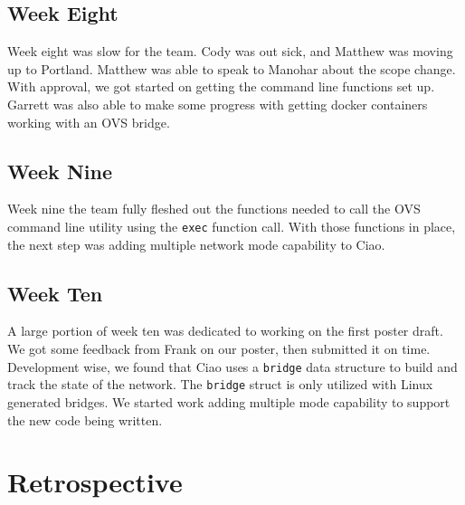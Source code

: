 \documentclass[10pt,onecolumn,journal,draftclsnofoot]{IEEEtran}
\begin{document}
\subsection{Week Eight}
Week eight was slow for the team. Cody was out sick, and Matthew was moving 
up to Portland. Matthew was able to speak to Manohar about the scope change. 
With approval, we got started on getting the command line functions set up.
Garrett was also able to make some progress with getting docker containers
working with an OVS bridge.

\subsection{Week Nine}
Week nine the team fully fleshed out the functions needed to call the OVS
command line utility using the \texttt{exec} function call. With those functions
in place, the next step was adding multiple network mode capability to Ciao.

\subsection{Week Ten}
A large portion of week ten was dedicated to working on the first poster draft.
We got some feedback from Frank on our poster, then submitted it on time. Development
wise, we found that Ciao uses a \texttt{bridge} data structure to build and 
track the state of the network. The \texttt{bridge} struct is only utilized with
Linux generated bridges. We started work adding multiple mode capability to
support the new code being written.

\section{Retrospective}
\end{document}

